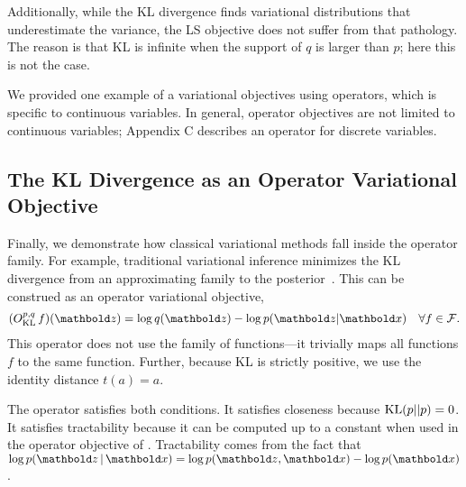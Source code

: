 Additionally, while the \gls{KL} divergence finds variational
distributions that underestimate the variance, the \gls{LS} objective
does not suffer from that pathology.  The reason is that \gls{KL} is
infinite when the support of $q$ is larger than $p$; here this is not
the case.


We provided one example of a variational
objectives using operators, which is specific to continuous variables. In
general, operator objectives are not
limited to continuous variables; Appendix C describes an operator for
discrete variables.

\subsection{The KL Divergence as an Operator Variational Objective}
Finally, we demonstrate how classical variational methods fall inside
the operator family.  For example, traditional variational inference
minimizes the \gls{KL} divergence from an approximating family to the
posterior~\citep{Jordan:1999}. This can be construed as an operator
variational objective,
\begin{align}
  \label{eq:KL-operator}
  (O^{p,q}_{\rm KL}  \,  f)(\mbz) = \log q(\mbz) - \log p(\mbz | \mbx)
  \quad
  \forall f\in\cF.
\end{align}
This operator does not use the family of functions---it trivially maps
all functions $f$ to the same function. Further, because \gls{KL} is
strictly positive, we use the identity distance $t(a) = a$.

The operator satisfies both conditions.  It satisfies closeness
because ${\rm KL}(p || p) = 0$.  It satisfies tractability because it
can be computed up to a constant when used in the operator objective
of .  Tractability comes from the fact that
$\log p(\mbz \g \mbx) = \log p(\mbz, \mbx) - \log p(\mbx)$.

